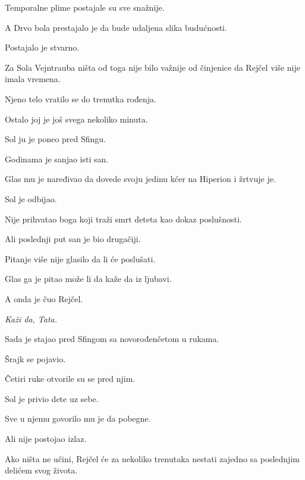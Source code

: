 Temporalne plime postajale su sve snažnije.

\bigskip

A Drvo bola prestajalo je da bude udaljena slika budućnosti.

Postajalo je stvarno.

\bigskip

Za Sola Vejntrauba ništa od toga nije bilo važnije od činjenice da Rejčel više nije imala vremena.

\bigskip

Njeno telo vratilo se do trenutka rođenja.

Ostalo joj je još svega nekoliko minuta.

\bigskip

Sol ju je poneo pred Sfingu.

\bigskip

Godinama je sanjao isti san.

Glas mu je naređivao da dovede svoju jedinu kćer na Hiperion i žrtvuje je.

Sol je odbijao.

\bigskip

Nije prihvatao boga koji traži smrt deteta kao dokaz poslušnosti.

\bigskip

Ali poslednji put san je bio drugačiji.

\bigskip

Pitanje više nije glasilo da li će poslušati.

Glas ga je pitao može li da kaže da iz ljubavi.

\bigskip

A onda je čuo Rejčel.

\bigskip

\emph{Kaži da, Tata.}

\bigskip

Sada je stajao pred Sfingom sa novorođenčetom u rukama.

\bigskip

Šrajk se pojavio.

\bigskip

Četiri ruke otvorile su se pred njim.

\bigskip

Sol je privio dete uz sebe.

Sve u njemu govorilo mu je da pobegne.

\bigskip

Ali nije postojao izlaz.

Ako ništa ne učini, Rejčel će za nekoliko trenutaka nestati zajedno sa poslednjim delićem svog života.

